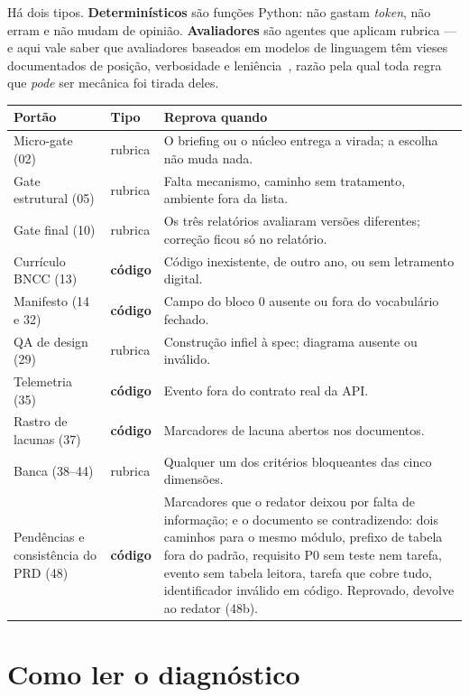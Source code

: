 \documentclass[11pt,a4paper]{article}
\begin{document}
Há dois tipos. \textbf{Determinísticos} são funções Python: não gastam \emph{token}, não erram
e não mudam de opinião. \textbf{Avaliadores} são agentes que aplicam rubrica --- e aqui vale
saber que avaliadores baseados em modelos de linguagem têm vieses documentados de posição,
verbosidade e leniência~\cite{zheng2023}, razão pela qual toda regra que \emph{pode} ser
mecânica foi tirada deles.

\begin{center}
\begin{longtable}{p{3.5cm}p{1.6cm}p{9.3cm}}
\toprule
\textbf{Portão} & \textbf{Tipo} & \textbf{Reprova quando} \\
\midrule
\endfirsthead
Micro-gate (02) & rubrica & O briefing ou o núcleo entrega a virada; a escolha não muda nada. \\
Gate estrutural (05) & rubrica & Falta mecanismo, caminho sem tratamento, ambiente fora da lista. \\
Gate final (10) & rubrica & Os três relatórios avaliaram versões diferentes; correção ficou só no relatório. \\
Currículo BNCC (13) & \textbf{código} & Código inexistente, de outro ano, ou sem letramento digital. \\
Manifesto (14 e 32) & \textbf{código} & Campo do bloco 0 ausente ou fora do vocabulário fechado. \\
QA de design (29) & rubrica & Construção infiel à spec; diagrama ausente ou inválido. \\
Telemetria (35) & \textbf{código} & Evento fora do contrato real da API. \\
Rastro de lacunas (37) & \textbf{código} & Marcadores de lacuna abertos nos documentos. \\
Banca (38--44) & rubrica & Qualquer um dos critérios bloqueantes das cinco dimensões. \\
Pendências e consistência do PRD (48) & \textbf{código} & Marcadores que o redator deixou por falta de
informação; e o documento se contradizendo: dois caminhos para o mesmo módulo, prefixo de tabela fora do
padrão, requisito P0 sem teste nem tarefa, evento sem tabela leitora, tarefa que cobre tudo, identificador
inválido em código. Reprovado, devolve ao redator (48b). \\
\bottomrule
\end{longtable}
\end{center}

\section{Como ler o diagnóstico}
\end{document}
